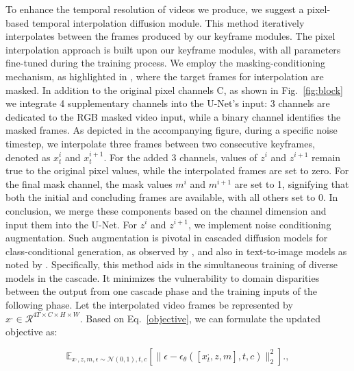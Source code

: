 \documentclass{article} \usepackage{iclr2024_conference,times}
\begin{document}
To enhance the temporal resolution of videos we produce, we suggest a pixel-based temporal interpolation diffusion module. This method iteratively interpolates between the frames produced by our keyframe modules. The pixel interpolation approach is built upon our keyframe modules, with all parameters fine-tuned during the training process. We employ the masking-conditioning mechanism, as highlighted in \citep{blattmann2023align}, where the target frames for interpolation are masked. In addition to the original pixel channels C, as shown in Fig.~\ref{fig:block} we integrate 4 supplementary channels into the U-Net's input: 3 channels are dedicated to the RGB masked video input, while a binary channel identifies the masked frames. As depicted in the accompanying figure, during a specific noise timestep, we interpolate three frames between two consecutive keyframes, denoted as $x^{i}_{t}$ and $x^{i+1}_{t}$. For the added 3 channels, values of $z^{i}$ and $z^{i+1}$ remain true to the original pixel values, while the interpolated frames are set to zero. For the final mask channel, the mask values $m^{i}$ and $m^{i+1}$ are set to 1, signifying that both the initial and concluding frames are available, with all others set to 0. In conclusion, we merge these components based on the channel dimension and input them into the U-Net. For \(z^{i}\) and \(z^{i+1}\), we implement noise conditioning augmentation. Such augmentation is pivotal in cascaded diffusion models for class-conditional generation, as observed by \citep{ho2022imagen}, and also in text-to-image models as noted by \citep{he2022latent}. Specifically, this method aids in the simultaneous training of diverse models in the cascade. It minimizes the vulnerability to domain disparities between the output from one cascade phase and the training inputs of the following phase. Let the interpolated video frames be represented by $x^{,} \in \mathcal{R}^{4T \times C \times H \times W}$. Based on Eq.~\ref{objective}, we can formulate the updated objective as:

\begin{equation}
\mathbb{E}_{x^{,}, z, m ,\epsilon \sim \mathcal{N}(0, 1), t, c} \left[ \| \epsilon - \epsilon_\theta([x^{,}_t,z,m], t, c) \|^2_2 \right].,
\end{equation}
\label{inter}

\vspace{-5mm}
\end{document}
